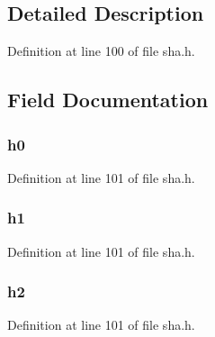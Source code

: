 \subsection{Detailed Description}


Definition at line 100 of file sha.\+h.



\subsection{Field Documentation}
\subsubsection[{\texorpdfstring{h0}{h0}}]{ h0}\hypertarget{struct_s_h_astate__st_a66b225c56f4115aa9aaacfcdbc2d1d59}{}\label{struct_s_h_astate__st_a66b225c56f4115aa9aaacfcdbc2d1d59}


Definition at line 101 of file sha.\+h.

\subsubsection[{\texorpdfstring{h1}{h1}}]{ h1}\hypertarget{struct_s_h_astate__st_ae7c9ea2e90661419985213ed54f8d9ca}{}\label{struct_s_h_astate__st_ae7c9ea2e90661419985213ed54f8d9ca}


Definition at line 101 of file sha.\+h.

\subsubsection[{\texorpdfstring{h2}{h2}}]{ h2}\hypertarget{struct_s_h_astate__st_af9bdc619992104ff7968a17e350f7035}{}\label{struct_s_h_astate__st_af9bdc619992104ff7968a17e350f7035}


Definition at line 101 of file sha.\+h.

